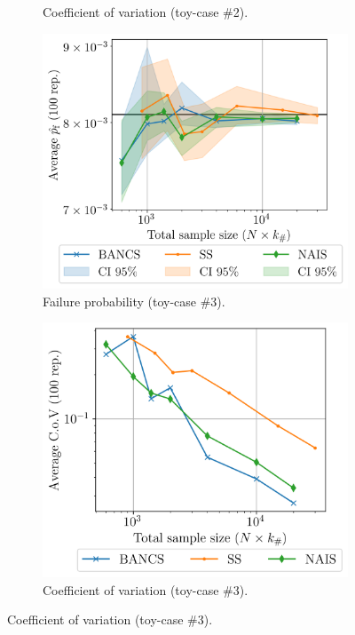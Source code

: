 \begin{figure}
\begin{subfigure}[b]{0.47\linewidth}
        \caption{Coefficient of variation (toy-case \#2).}
    \end{subfigure}
    \begin{subfigure}[b]{0.49\linewidth}
        \centering
        \includegraphics[width=\linewidth]{part3/figures/BANCS/RP38_mean.png}
        \caption{Failure probability (toy-case \#3).}
    \end{subfigure}
    \begin{subfigure}[b]{0.47\linewidth}
        \centering
        \includegraphics[width=\linewidth]{part3/figures/BANCS/RP38_cov.png}
        \caption{Coefficient of variation (toy-case \#3).}
    \end{subfigure}


\end{figure}
